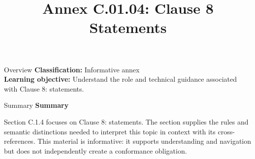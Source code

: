\documentclass[10pt,letterpaper]{article}
\title{Annex C.01.04: Clause 8 Statements}
\author{}
\date{}
\begin{document}
\maketitle
\begin{CornellOverviewBox}{Overview}
\textbf{Classification:} Informative annex\\[2pt]
\textbf{Learning objective:} Understand the role and technical guidance associated with Clause 8: statements.
\end{CornellOverviewBox}\begin{CornellSummaryBox}{Summary}
{\sffamily\bfseries\color{Accent} Summary}\par\vspace{3pt}Section C.1.4 focuses on Clause 8: statements. The section supplies the rules and semantic distinctions needed to interpret this topic in context with its cross-references. This material is informative: it supports understanding and navigation but does not independently create a conformance obligation.
\end{CornellSummaryBox}
\end{document}

